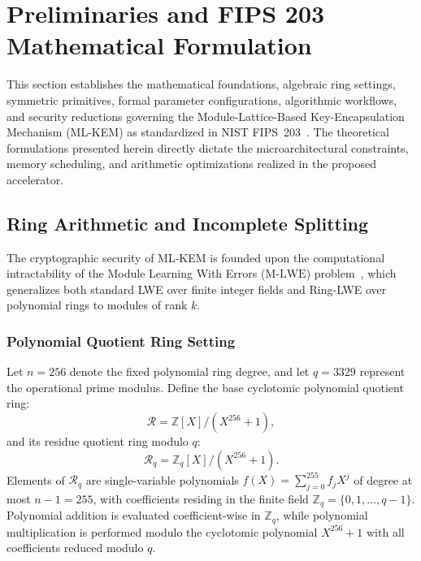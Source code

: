 \section{Preliminaries and FIPS 203 Mathematical Formulation}
\label{sec:preliminaries}

This section establishes the mathematical foundations, algebraic ring settings, symmetric primitives, formal parameter configurations, algorithmic workflows, and security reductions governing the Module-Lattice-Based Key-Encapsulation Mechanism (\mbox{ML-KEM}) as standardized in NIST FIPS~203~\cite{fips203}. The theoretical formulations presented herein directly dictate the microarchitectural constraints, memory scheduling, and arithmetic optimizations realized in the proposed accelerator.

\subsection{Ring Arithmetic and Incomplete Splitting}
\label{sec:prelim_ring}

The cryptographic security of \mbox{ML-KEM} is founded upon the computational intractability of the Module Learning With Errors ($\text{M-LWE}$) problem~\cite{langlois2015, bos2018kyber}, which generalizes both standard LWE over finite integer fields and Ring-LWE over polynomial rings to modules of rank $k$.

\subsubsection{Polynomial Quotient Ring Setting}
Let $n = 256$ denote the fixed polynomial ring degree, and let $q = 3329$ represent the operational prime modulus. Define the base cyclotomic polynomial quotient ring:
\begin{equation}
\label{eq:base_ring}
\mathcal{R} = \mathbb{Z}[X] / (X^{256} + 1),
\end{equation}
and its residue quotient ring modulo $q$:
\begin{equation}
\label{eq:residue_ring}
\mathcal{R}_q = \mathbb{Z}_q[X] / (X^{256} + 1).
\end{equation}
Elements of $\mathcal{R}_q$ are single-variable polynomials $f(X) = \sum_{j=0}^{255} f_j X^j$ of degree at most $n - 1 = 255$, with coefficients residing in the finite field $\mathbb{Z}_q = \{0, 1, \dots, q - 1\}$. Polynomial addition is evaluated coefficient-wise in $\mathbb{Z}_q$, while polynomial multiplication is performed modulo the cyclotomic polynomial $X^{256} + 1$ with all coefficients reduced modulo $q$.

